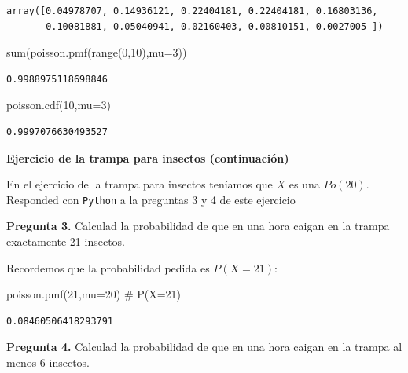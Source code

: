 \documentclass[
  letterpaper,
  DIV=11,
  numbers=noendperiod]{scrreprt}
\newenvironment{Shaded}{\begin{snugshade}}{\end{snugshade}}
\newcommand{\BuiltInTok}[1]{\textcolor[rgb]{0.00,0.23,0.31}{#1}}
\newcommand{\CommentTok}[1]{\textcolor[rgb]{0.37,0.37,0.37}{#1}}
\newcommand{\DecValTok}[1]{\textcolor[rgb]{0.68,0.00,0.00}{#1}}
\newcommand{\NormalTok}[1]{\textcolor[rgb]{0.00,0.23,0.31}{#1}}
\newcommand{\OperatorTok}[1]{\textcolor[rgb]{0.37,0.37,0.37}{#1}}
\begin{document}
\begin{verbatim}
array([0.04978707, 0.14936121, 0.22404181, 0.22404181, 0.16803136,
       0.10081881, 0.05040941, 0.02160403, 0.00810151, 0.0027005 ])
\end{verbatim}

\begin{Shaded}
\begin{Highlighting}[]
\BuiltInTok{sum}\NormalTok{(poisson.pmf(}\BuiltInTok{range}\NormalTok{(}\DecValTok{0}\NormalTok{,}\DecValTok{10}\NormalTok{),mu}\OperatorTok{=}\DecValTok{3}\NormalTok{))}
\end{Highlighting}
\end{Shaded}

\begin{verbatim}
0.9988975118698846
\end{verbatim}

\begin{Shaded}
\begin{Highlighting}[]
\NormalTok{poisson.cdf(}\DecValTok{10}\NormalTok{,mu}\OperatorTok{=}\DecValTok{3}\NormalTok{)}
\end{Highlighting}
\end{Shaded}

\begin{verbatim}
0.9997076630493527
\end{verbatim}

\textbf{Ejercicio de la trampa para insectos (continuación)}

En el ejercicio de la trampa para insectos teníamos que \(X\) es una
\(Po(20)\). Responded con \texttt{Python} a la preguntas 3 y 4 de este
ejercicio

\textbf{Pregunta 3.} Calculad la probabilidad de que en una hora caigan
en la trampa exactamente 21 insectos.

Recordemos que la probabilidad pedida es \(P(X=21)\):

\begin{Shaded}
\begin{Highlighting}[]
\NormalTok{poisson.pmf(}\DecValTok{21}\NormalTok{,mu}\OperatorTok{=}\DecValTok{20}\NormalTok{) }\CommentTok{\# P(X=21)}
\end{Highlighting}
\end{Shaded}

\begin{verbatim}
0.08460506418293791
\end{verbatim}

\textbf{Pregunta 4.} Calculad la probabilidad de que en una hora caigan
en la trampa al menos 6 insectos.
\end{document}
